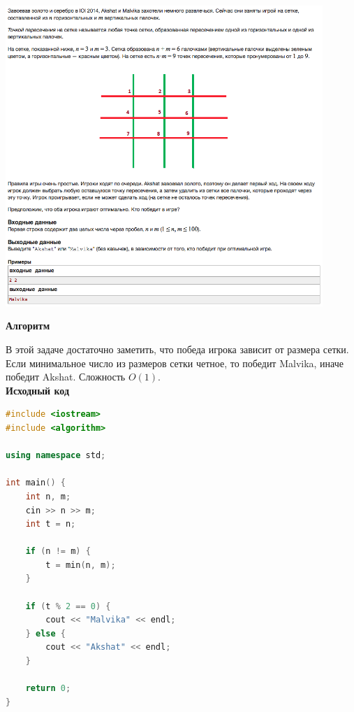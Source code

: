 \documentclass[a4paper,12pt]{article}
\begin{document}
\begin{center}
\includegraphics[width=0.9\textwidth]{C_258/A.png}\\ [1cm]
\end{center}

\textbf{{\large Алгоритм}}

В этой задаче достаточно заметить, что победа игрока зависит от размера сетки. Если минимальное число из размеров сетки четное, то победит Malvika, иначе победит Akshat. Сложность $O(1)$.\\

\textbf{{\large Исходный код}} \\
\begin{lstlisting}[language=C++]
#include <iostream>
#include <algorithm>

using namespace std;

int main() {
    int n, m;
    cin >> n >> m;
    int t = n;
    
    if (n != m) {
        t = min(n, m);
    }
    
    if (t % 2 == 0) {
        cout << "Malvika" << endl;
    } else {
        cout << "Akshat" << endl;
    }
    
    return 0;
}
\end{lstlisting}




%
%
\end{document}
